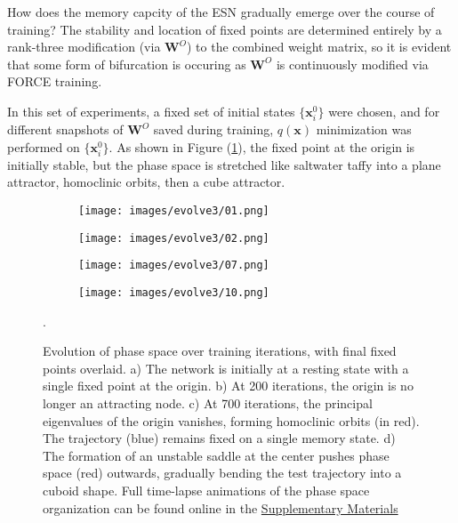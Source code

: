 \documentclass{article} %
\newcommand{\bf}[1]{\mathbf{#1}}
\newcommand{\x}{\bf{x}}
\begin{document}
How does the memory capcity of the ESN gradually emerge over the course of training? The stability and location of fixed points are determined entirely by a rank-three modification (via $\bf{W}^O$) to the combined weight matrix, so it is evident that some form of bifurcation is occuring as $\bf{W}^O$ is continuously modified via FORCE training.

In this set of experiments, a fixed set of initial states $\{\x^0_i\}$ were chosen, and for different snapshots of $\bf{W}^O$ saved during training, $q(\x)$ minimization was performed on $\{\x^0_i\}$. As shown in Figure (\ref{fig:weightbend}), the fixed point at the origin is initially stable, but the phase space is stretched like saltwater taffy into a plane attractor, homoclinic orbits, then a cube attractor.

\begin{figure}
\centering
\begin{subfigure}{.5\textwidth}
  \centering
  \texttt{[image: images/evolve3/01.png]}
  \caption{}
\end{subfigure}%
\begin{subfigure}{.5\textwidth}
  \centering
  \texttt{[image: images/evolve3/02.png]}
  \caption{}
\end{subfigure}
\begin{subfigure}{.5\textwidth}
  \centering
  \texttt{[image: images/evolve3/07.png]}
  \caption{}
\end{subfigure}%
\begin{subfigure}{.5\textwidth}
  \centering
  \texttt{[image: images/evolve3/10.png]}
  \caption{}
\end{subfigure}
\caption{Evolution of phase space over training iterations, with final fixed points overlaid. a) The network is initially at a resting state with a single fixed point at the origin. b) At 200 iterations, the origin is no longer an attracting node. c) At 700 iterations, the principal eigenvalues of the origin vanishes, forming homoclinic orbits (in red). The trajectory (blue) remains fixed on a single memory state. d) The formation of an unstable saddle at the center pushes  phase space (red) outwards, gradually bending the test trajectory into a cuboid shape. Full time-lapse animations of the phase space organization can be found online in the \href{https://github.com/ericjang/RNN-dynamics}{Supplementary Materials}}.
\label{fig:weightbend}
\end{figure}
\end{document}
